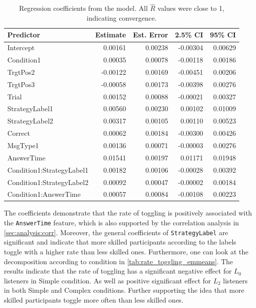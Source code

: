 \begin{table}[ht]
\centering
\caption{Regression coefficients from the model. All $\hat{R}$ values were close to 1, indicating convergence.}
\begin{tabular}{lrrrr}
\hline
\textbf{Predictor} & \textbf{Estimate} & \textbf{Est. Error} & \textbf{2.5\% CI} & \textbf{95\% CI} \\
\hline
Intercept                  & 0.00161 & 0.00238 & -0.00304 & 0.00629 \\
Condition1                 & 0.00035 & 0.00078 & -0.00118 & 0.00186 \\
TrgtPos2                    & -0.00122 & 0.00169 & -0.00451 & 0.00206 \\
TrgtPos3                    & -0.00058 & 0.00173 & -0.00398 & 0.00276 \\
Trial                       & 0.00152 & 0.00088 & -0.00021 & 0.00327 \\
StrategyLabel1              & 0.00560 & 0.00230 & 0.00102  & 0.01009 \\
StrategyLabel2              & 0.00317 & 0.00105 & 0.00110  & 0.00523 \\
Correct                     & 0.00062 & 0.00184 & -0.00300 & 0.00426 \\
MsgType1                    & 0.00136 & 0.00071 & -0.00003 & 0.00276 \\
AnswerTime                  & 0.01541 & 0.00197 & 0.01171  & 0.01948 \\
Condition1:StrategyLabel1   & 0.00182 & 0.00106 & -0.00028 & 0.00392 \\
Condition1:StrategyLabel2   & 0.00092 & 0.00047 & -0.00002 & 0.00184 \\
Condition1:AnswerTime       & 0.00057 & 0.00084 & -0.00108 & 0.00223 \\
\hline
\end{tabular}
\label{tab:model_coefficients_rate_toggling}
\end{table}


The coefficients demonstrate that the rate of toggling is positively associated with the \texttt{AnswerTime} feature, which is also supported by the correlation analysis in \autoref{sec:analysis:corr}. Moreover, the general coefficients of \texttt{StrategyLabel} are significant and indicate that more skilled participants according to the labels toggle with a higher rate than less skilled ones. Furthermore, one can look at the decomposition according to condition in \autoref{tab:rate_toggling_emmeans}. The results indicate that the rate of toggling has a significant negative effect for $L_0$ listeners in Simple condition. As well as positive significant effect for $L_2$ listeners in both Simple and Complex conditions. Further supporting the idea that more skilled participants toggle more often than less skilled ones. 

